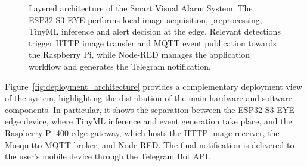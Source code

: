 \documentclass{article}
\begin{document}
\begin{figure}[htbp]
{
}
\caption{Layered architecture of the Smart Visual Alarm System. The ESP32-S3-EYE
performs local image acquisition, preprocessing, TinyML inference and alert
decision at the edge. Relevant detections trigger HTTP image transfer and MQTT
event publication towards the Raspberry Pi, while Node-RED manages the
application workflow and generates the Telegram notification.}
\label{fig:system_architecture}
\end{figure}


Figure~\ref{fig:deployment_architecture} provides a complementary deployment
view of the system, highlighting the distribution of the main hardware and
software components. In particular, it shows the separation between the
ESP32-S3-EYE edge device, where TinyML inference and event generation take
place, and the Raspberry Pi 400 edge gateway, which hosts the HTTP image
receiver, the Mosquitto MQTT broker, and Node-RED. The final notification is
delivered to the user's mobile device through the Telegram Bot API.
\end{document}
